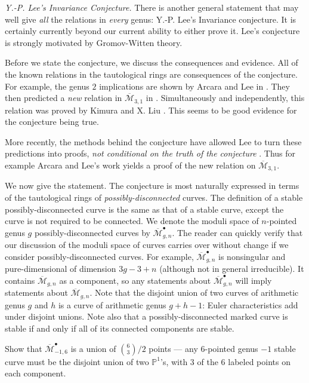 \documentclass[12pt,letterpaper]{amsart}
\newcommand{\epoint}[1]{\vspace{3mm}\par \noindent \refstepcounter{subsection}{\bf \thesubsection.} 
  {\em #1.} }
\newcommand{\proj}{\mathbb P}
\newcommand{\cm}{{\mathcal{M}}}
\newcommand{\cmbar}{\overline{\cm}}
\newcommand{\dis}{\bullet}
\newcommand{\lremind}[1]{{\bf[label:  #1]}}
\renewcommand{\lremind}[1]{{}}
\begin{document}
{\epoint{Y.-P. Lee's Invariance Conjecture}
There is another general statement that may well give {\em all} the
relations in {\em every} genus: Y.-P. Lee's {Invariance
  conjecture}.  It is certainly currently
beyond our current ability to either prove it.
Lee's conjecture is strongly motivated by
Gromov-Witten theory.\label{sic}\lremind{sic}

Before we state the conjecture, we discuss the
consequences and evidence.  All of the known relations in the
tautological rings are consequences of the conjecture.  For example,
the genus $2$ implications are shown by Arcara and Lee in \cite{al2}.
They then predicted a {\em new} relation in $\cmbar_{3,1}$ in
\cite{al3}.  Simultaneously and independently, this relation was
proved by Kimura and X. Liu \cite{kl}. This seems to be good evidence
for the conjecture being true.

More recently, the methods behind the conjecture have allowed Lee to
turn these predictions into proofs, {\em not conditional on the truth
  of the conjecture} \cite{lee2}.  Thus for example Arcara and Lee's
work yields a proof of the new relation on $\cmbar_{3,1}$.

We now give the statement.  The conjecture is most naturally expressed
in terms of the tautological rings of {\em possibly-disconnected}
curves.  The definition of a stable possibly-disconnected curve is the
same as that of a stable curve, except the curve is not required to be
connected.  We denote the moduli space of $n$-pointed genus $g$
possibly-disconnected curves by $\cmbar_{g,n}^{\dis}$.  The reader can
quickly verify that our discussion of the moduli space of curves
carries over without change if we consider possibly-disconnected
curves.  For example, $\cmbar_{g,n}^{\dis}$ is nonsingular and
pure-dimensional of dimension $3g-3+n$ (although not in general
irreducible).  It contains $\cmbar_{g,n}$ as a component, so
any statements about $\cmbar_{g,n}^{\dis}$ will imply statements about
$\cmbar_{g,n}$.  Note that the disjoint union of two curves of
arithmetic genus $g$ and $h$ is a curve of arithmetic genus $g+h-1$:
Euler characteristics add under disjoint unions.  Note also that a
possibly-disconnected marked curve is stable if and only if all of its
connected components are stable.

Show that $\cmbar_{-1,6}^{\dis}$ is a union of $\binom 6 3 / 2$ points
--- any $6$-pointed genus $-1$ stable curve must be the disjoint union
of two $\proj^1$'s, with $3$ of the $6$ labeled points on each component.

}
\end{document}
